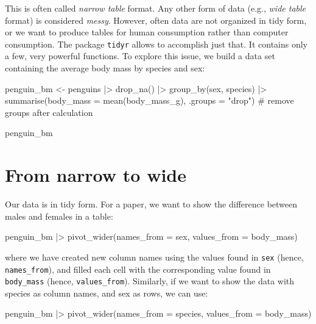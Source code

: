 \documentclass[
  letterpaper,
  DIV=11,
  numbers=noendperiod]{scrreprt}
\newenvironment{Shaded}{\begin{snugshade}}{\end{snugshade}}
\newcommand{\NormalTok}[1]{\textcolor[rgb]{0.00,0.23,0.31}{#1}}
\begin{document}
This is often called \emph{narrow table} format. Any other form of data
(e.g., \emph{wide table} format) is considered \emph{messy}. However,
often data are not organized in tidy form, or we want to produce tables
for human consumption rather than computer consumption. The package
\texttt{tidyr} allows to accomplish just that. It contains only a few,
very powerful functions. To explore this issue, we build a data set
containing the average body mass by species and sex:

\begin{Shaded}
\begin{Highlighting}[]
\NormalTok{penguin\_bm \textless{}{-} penguins |\textgreater{} }
\NormalTok{  drop\_na() |\textgreater{} }
\NormalTok{  group\_by(sex, species) |\textgreater{} }
\NormalTok{  summarise(body\_mass = mean(body\_mass\_g), .groups = "drop") \# remove groups after calculation}

\NormalTok{penguin\_bm}
\end{Highlighting}
\end{Shaded}

\section{From narrow to wide}\label{from-narrow-to-wide}

Our data is in tidy form. For a paper, we want to show the difference
between males and females in a table:

\begin{Shaded}
\begin{Highlighting}[]
\NormalTok{penguin\_bm |\textgreater{} }
\NormalTok{  pivot\_wider(names\_from = sex, values\_from = body\_mass)}
\end{Highlighting}
\end{Shaded}

where we have created new column names using the values found in
\texttt{sex} (hence, \texttt{names\_from}), and filled each cell with
the corresponding value found in \texttt{body\_mass} (hence,
\texttt{values\_from}). Similarly, if we want to show the data with
species as column names, and sex as rows, we can use:

\begin{Shaded}
\begin{Highlighting}[]
\NormalTok{penguin\_bm |\textgreater{} }
\NormalTok{  pivot\_wider(names\_from = species, values\_from = body\_mass)}
\end{Highlighting}
\end{Shaded}
\end{document}
